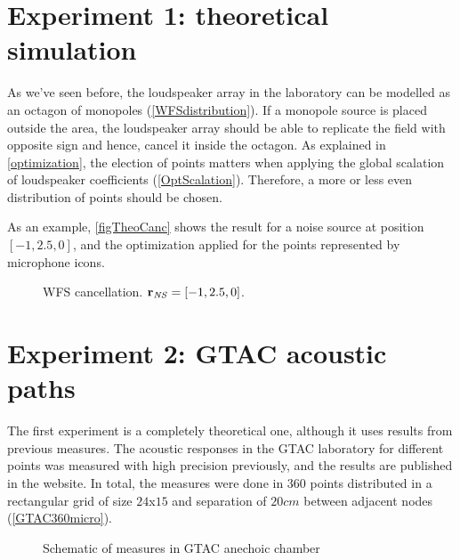 \section{Experiment 1: theoretical simulation}
As we've seen before, the loudspeaker array in the laboratory can be modelled as an octagon of monopoles (\autoref{WFSdistribution}). If a monopole source is placed outside the area, the loudspeaker array should be able to replicate the field with opposite sign and hence, cancel it inside the octagon. As explained in \autoref{optimization}, the election of points matters when applying the global scalation of loudspeaker coefficients (\autoref{OptScalation}). Therefore, a more or less even distribution of points should be chosen.

As an example, \autoref{figTheoCanc} shows the result for a noise source at position $[-1, 2.5, 0]$, and the optimization applied for the points represented by microphone icons.

\begin{figure}
	\centering
	\caption[WFS cancellation]{WFS cancellation. $\mathbf{r}_{\mathit{NS}} = [-1, 2.5, 0]$.}
	\label{figTheoCanc}
\end{figure}


\section{Experiment 2: GTAC acoustic paths}
The first experiment is a completely theoretical one, although it uses results from previous measures. The acoustic responses in the GTAC laboratory for different points was measured with high precision previously, and the results are published in the website. In total, the measures were done in 360 points distributed in a rectangular grid of size $24$x$15$ and separation of $20 \si{cm}$ between adjacent nodes (\autoref{GTAC360micro}).

\begin{figure}
	\centering
	\caption[Schematic of measures in GTAC anechoic chamber]{Schematic of measures in GTAC anechoic chamber}
	\label{GTAC360micro}
\end{figure}


